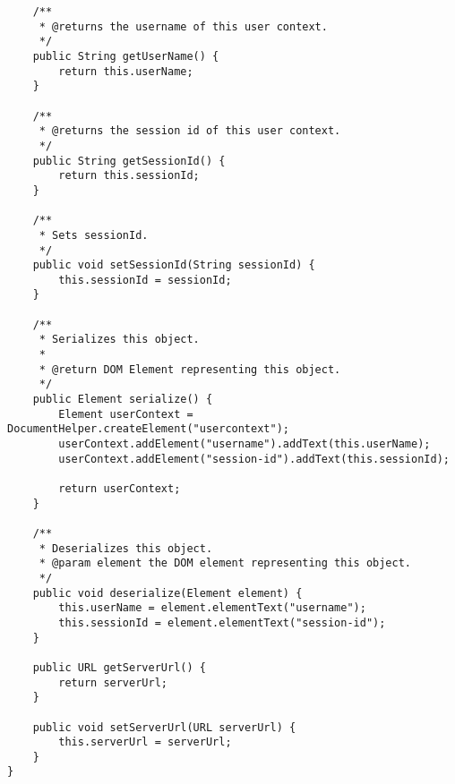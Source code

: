 \begin{verbatim}
    /**
     * @returns the username of this user context.  
     */
    public String getUserName() {
        return this.userName;
    }

    /**
     * @returns the session id of this user context.
     */
    public String getSessionId() {
        return this.sessionId;
    }

	/**
	 * Sets sessionId.
	 */
	public void setSessionId(String sessionId) {
		this.sessionId = sessionId;
	}
	
	/**
	 * Serializes this object.
	 * 
	 * @return DOM Element representing this object.
	 */
	public Element serialize() {
		Element userContext = DocumentHelper.createElement("usercontext");
		userContext.addElement("username").addText(this.userName);
		userContext.addElement("session-id").addText(this.sessionId);
		
		return userContext;
	}
	
	/**
	 * Deserializes this object.
	 * @param element the DOM element representing this object.
	 */
	public void deserialize(Element element) {
		this.userName = element.elementText("username");
		this.sessionId = element.elementText("session-id");
	}
	
    public URL getServerUrl() {
        return serverUrl;
    }
    
    public void setServerUrl(URL serverUrl) {
        this.serverUrl = serverUrl;
    }
}
\end{verbatim}
